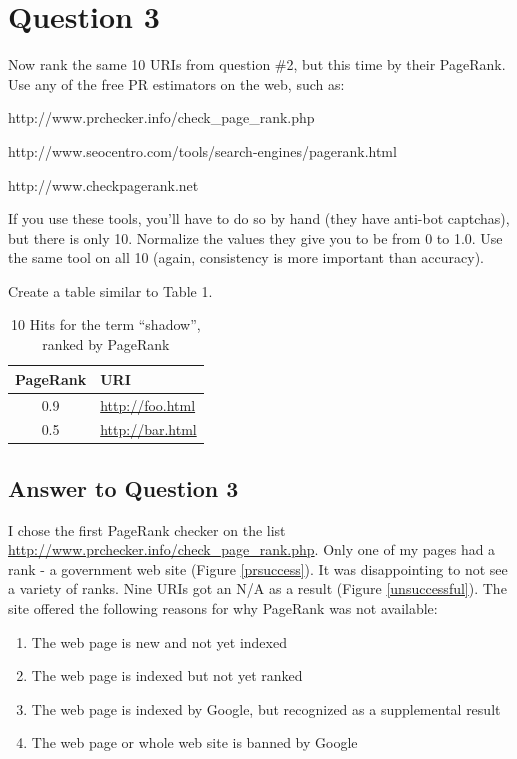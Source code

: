 \documentclass{article}
\begin{document}
\clearpage

\section*{Question 3}

Now rank the same 10 URIs from question \#2, but this time by their PageRank. Use any of the free PR estimators on the web, such as:

http://www.prchecker.info/check\_page\_rank.php

http://www.seocentro.com/tools/search-engines/pagerank.html

http://www.checkpagerank.net

If you use these tools, you'll have to do so by hand (they have anti-bot captchas), but there is only 10. Normalize the values they give you to be from 0 to 1.0. Use the same tool on all 10 (again, consistency is more important than accuracy).

Create a table similar to Table 1.

\begin{table}[!h]
\centering
\caption{10 Hits for the term ``shadow'', ranked by PageRank}
\begin{tabular}{c p{10cm}}
\hline
PageRank & URI \\
\hline
\hline
0.9 & \url{http://foo.html} \\
0.5 & \url{http://bar.html} \\
\hline
\end{tabular}
\end{table}

\subsection*{Answer to Question 3}

I chose the first PageRank checker on the list \url{http://www.prchecker.info/check_page_rank.php}. Only one of my pages had a rank - a government web site (Figure \ref{prsuccess}). It was disappointing to not see a variety of ranks. Nine URIs got an N/A as a result (Figure \ref{unsuccessful}). The site offered the following reasons for why PageRank was not available:

\begin{enumerate}
\item The web page is new and not yet indexed
\item The web page is indexed but not yet ranked
\item The web page is indexed by Google, but recognized as a supplemental result
\item The web page or whole web site is banned by Google
\end{enumerate}
\end{document}
